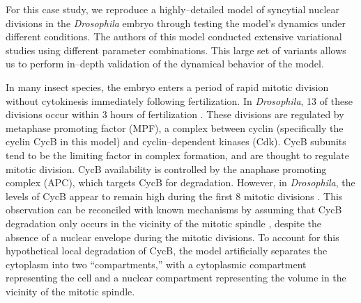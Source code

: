 \documentclass[10pt,letterpaper]{article}
\begin{document}
For this case study, we reproduce a highly--detailed model of syncytial nuclear divisions in the \textit{Drosophila} embryo \cite{calzone2007dynamical} through testing the model's dynamics under different conditions. The authors of this model conducted extensive variational studies using different parameter combinations. This large set of variants allows us to perform in--depth validation of the dynamical behavior of the model.

In many insect species, the embryo enters a period of rapid mitotic division without cytokinesis \cite{gilbertDevBiol} immediately following fertilization. In \textit{Drosophila}, 13 of these divisions occur within 3 hours of fertilization \cite{calzone2007dynamical}. These divisions are regulated by metaphase promoting factor (MPF), a complex between cyclin (specifically the cyclin CycB in this model) and cyclin--dependent kinases (Cdk). CycB subunits tend to be the limiting factor in complex formation, and are thought to regulate mitotic division. CycB availability is controlled by the anaphase promoting complex (APC), which targets CycB for degradation. However, in \textit{Drosophila}, the levels of CycB appear to remain high during the first 8 mitotic divisions \cite{edgar1994distinct}. This observation can be reconciled with known mechanisms by assuming that CycB degradation only occurs in the vicinity of the mitotic spindle \cite{calzone2007dynamical,huang2002dynamic,raff2002roles}, despite the absence of a nuclear envelope during the mitotic divisions. To account for this hypothetical local degradation of CycB, the model artificially separates the cytoplasm into two ``compartments,'' with a cytoplasmic compartment representing the cell and a nuclear compartment representing the volume in the vicinity of the mitotic spindle.%
\end{document}
